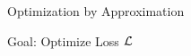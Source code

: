 \begin{frame}{Optimization by Approximation}

	Goal: Optimize Loss \(\mathcal{L}\)

	\begin{algorithm*}[H]
		\caption{Optimization by Approximation}
	\end{algorithm*}
\end{frame}
